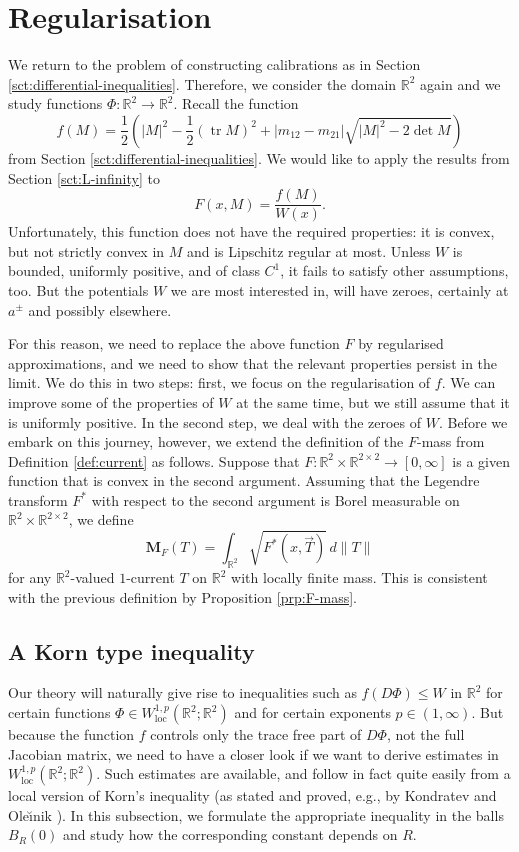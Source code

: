 \documentclass[a4paper]{article}
\newcommand{\R}{\mathbb{R}}
\newcommand{\M}{\mathbf{M}}
\newcommand{\loc}{\mathrm{loc}}
\DeclareMathOperator{\tr}{tr}
\theoremstyle{definition}
\theoremstyle{remark}
\begin{document}
\section{Regularisation} \label{sct:regularisation}

We return to the problem of constructing calibrations as in
Section \ref{sct:differential-inequalities}. Therefore, we consider the
domain $\R^2$ again and we study functions $\Phi \colon \R^2 \to \R^2$.
Recall the function
\[
f(M) = \frac{1}{2} \left(|M|^2 - \frac{1}{2} (\tr M)^2 + |m_{12} - m_{21}| \sqrt{|M|^2 - 2\det M}\right)
\]
from Section \ref{sct:differential-inequalities}.
We would like to apply the results from Section \ref{sct:L-infinity} to
\[
F(x, M) = \frac{f(M)}{W(x)}.
\]
Unfortunately, this function does not have the required properties: it is convex,
but not strictly convex in $M$ and is Lipschitz regular at most. Unless
$W$ is bounded, uniformly positive, and of class $C^1$, it fails to
satisfy other assumptions, too. But the potentials $W$ we are most interested
in, will have zeroes, certainly at $a^\pm$ and possibly elsewhere.

For this reason, we need to replace the above function $F$ by regularised
approximations, and we need to show that the relevant properties persist
in the limit. We do this in two steps: first, we focus on the regularisation
of $f$. We can improve some of the properties of $W$ at the same time, but
we still assume that it is uniformly positive. In the second step, we
deal with the zeroes of $W$. Before we embark on this journey, however, we
extend the definition of the $F$-mass from Definition \ref{def:current} as follows.
Suppose that $F \colon \R^2 \times \R^{2 \times 2} \to [0, \infty]$ is a given function that
is convex in the second argument. Assuming that the Legendre transform $F^*$ with respect to the
second argument is Borel measurable on $\R^2 \times \R^{2 \times 2}$, we define
\[
\M_F(T) = \int_{\R^2} \sqrt{F^*(x, \vec{T})} \, d\|T\|
\]
for any $\R^2$-valued $1$-current $T$ on $\R^2$ with locally finite mass.
This is consistent with the previous definition by Proposition \ref{prp:F-mass}.




\subsection{A Korn type inequality}

Our theory will naturally give rise to inequalities such as
$f(D\Phi) \le W$ in $\R^2$ for certain functions
$\Phi \in W_\loc^{1, p}(\R^2; \R^2)$ and for certain exponents
$p \in (1, \infty)$. But because the function $f$ controls only the
trace free part of $D\Phi$, not the full Jacobian matrix, we need to
have a closer look if we want to derive estimates in $W_\loc^{1, p}(\R^2; \R^2)$.
Such estimates are available, and follow in fact quite easily from a
local version of Korn's inequality (as stated and proved, e.g., by
Kondrat\cprime ev and Ole\u\i nik \cite[\S 2, Theorem 8]{Kondratev-Oleinik:88}).
In this subsection, we
formulate the appropriate inequality in the balls $B_R(0)$ and study
how the corresponding constant depends on $R$.
\end{document}
